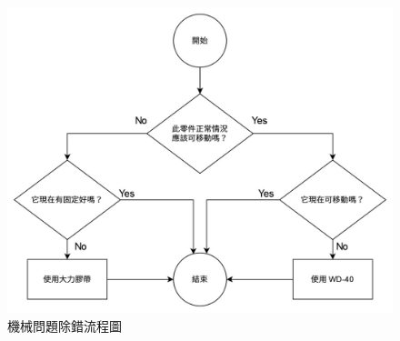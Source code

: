 \begin{figure}[!htbp]
\centering
\includegraphics[scale=0.28]{images/debug.jpg}
\caption{機械問題除錯流程圖}
\label{i:debug}
\end{figure}
